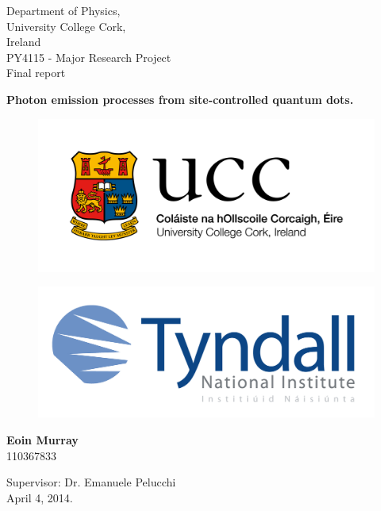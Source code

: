 \documentclass[12pt, twoside]{article}
\numberwithin{equation}{section}
\begin{document}

\begin{titlepage}
    \begin{center}

        \small
        Department of Physics,\\
        University College Cork,\\
        Ireland\\
        PY4115 - Major Research Project\\
        Final report

        \vspace*{1cm}

        \Large
        \textbf{Photon emission processes from site-controlled quantum dots.}

        \normalsize

        \vspace{0.5cm}

        \begin{figure}
          \centering
          \includegraphics[width=0.5\linewidth]{images/ucc-logo.jpg}
          \caption*{}
        \end{figure}

        \begin{figure}
          \centering
          \includegraphics[width=0.5\linewidth]{images/tyndall-logo.jpg}
          \caption*{}
        \end{figure}


        \large
        \textbf{Eoin Murray}\\
        \small{110367833}

        Supervisor: Dr. Emanuele Pelucchi
        \\April 4, 2014.

        \normalsize

    \end{center}
\end{titlepage}
\end{document}
